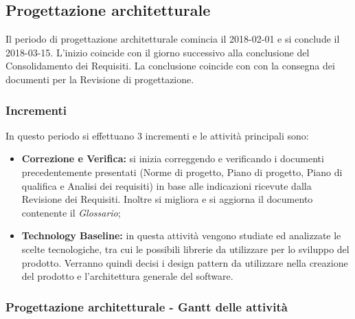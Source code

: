 \subsection{Progettazione architetturale}
Il periodo di progettazione architetturale comincia il 2018-02-01 e si conclude il 2018-03-15. L'inizio coincide con il giorno successivo alla conclusione del Consolidamento dei Requisiti. La conclusione coincide con con la consegna dei documenti per la Revisione di progettazione. \\
\subsubsection{Incrementi}
In questo periodo si effettuano 3 incrementi e le attività principali sono:
\begin{itemize}
	\item \textbf{Correzione e Verifica:} si inizia correggendo e verificando i documenti precedentemente presentati (Norme di progetto, Piano di progetto, Piano di qualifica e Analisi dei requisiti) in base alle indicazioni ricevute dalla Revisione dei Requisiti. Inoltre si migliora e si aggiorna il documento contenente il \textit{Glossario};
	\item \textbf{Technology Baseline:} in questa attività vengono studiate ed analizzate le scelte tecnologiche, tra cui le possibili librerie da utilizzare per lo sviluppo del prodotto. Verranno quindi decisi i design pattern da utilizzare nella creazione del prodotto e l'architettura generale del software.
\end{itemize}

\subsubsection{Progettazione architetturale - Gantt delle attività}

\pagebreak